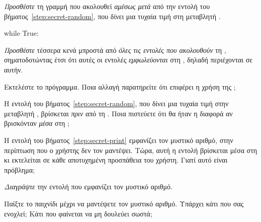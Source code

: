\documentclass[a4paper,11pt,oneside]{book}
\begin{document}
\begin{step}
\emph{Προσθέστε} τη γραμμή που ακολουθεί \emph{αμέσως μετά} από την εντολή του βήματος~\ref{step:secret-random}, που δίνει μια τυχαία τιμή στη μεταβλητή .



\begin{pynew}
while True:
\end{pynew}

\emph{Προσθέστε} τέσσερα κενά μπροστά από \emph{όλες τις εντολές που ακολουθούν} τη , σηματοδοτώντας έτσι ότι αυτές οι εντολές \emph{εμφωλεύονται} στη , δηλαδή περιέχονται σε αυτήν.

Εκτελέστε το πρόγραμμα. 
Ποια αλλαγή παρατηρείτε ότι επιφέρει η χρήση της ;

\dottedline

\dottedline

Η εντολή του βήματος~\ref{step:secret-random}, που δίνει μια τυχαία τιμή στην μεταβλητή , βρίσκεται \emph{πριν} από τη . Ποια πιστεύετε ότι θα ήταν η διαφορά αν βρισκόνταν \emph{μέσα} στη ;

\marginnote[14pt]{\icondiscuss}
\dottedline

\dottedline

\label{step:secret-print-remove}
Η εντολή του βήματος~\ref{step:secret-print} εμφανίζει τον μυστικό αριθμό, στην περίπτωση που ο χρήστης δεν τον μαντέψει. Τώρα, αυτή η εντολή βρίσκεται μέσα στη  κι εκτελείται σε κάθε αποτυχημένη προσπάθεια του χρήστη. Γιατί αυτό είναι πρόβλημα;

\marginnote[14pt]{\icondiscuss}
\dottedline

\dottedline

\emph{Διαγράψτε} την εντολή που εμφανίζει τον μυστικό αριθμό.

Παίξτε το παιχνίδι μέχρι να μαντέψετε τον μυστικό αριθμό. Υπάρχει κάτι που σας ενοχλεί; Κάτι που φαίνεται να μη δουλεύει σωστά;

\marginnote[14pt]{\icondiscuss}
\dottedline

\dottedline
\end{step}
\end{document}
